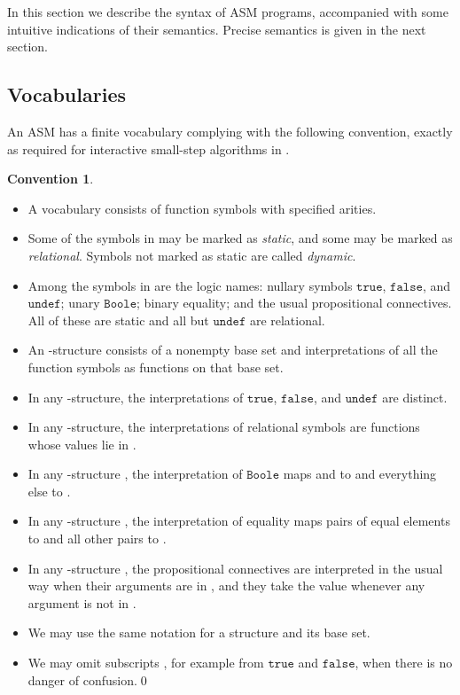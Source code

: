 \documentclass{LMCS}
\theoremstyle{definition}
\newtheorem{conn}[thm]{Convention}
\newenvironment{ls}{\begin{itemize}}{\end{itemize}}
\newcommand{\ttt}[1]{\ensuremath{\mathtt {#1}}}
\begin{document}
In this section we describe the syntax of ASM programs, accompanied
with some intuitive indications of their semantics.  Precise semantics
is given in the next section.

\subsection{Vocabularies}

An ASM has a finite vocabulary  complying with the following
convention, exactly as required for interactive small-step algorithms
in \cite{ga1}.

\begin{conn}   \label{vocab}
\mbox{}
  \begin{ls}
    \item A vocabulary  consists of function symbols with
    specified arities.
    \item Some of the symbols in  may be marked as
    \emph{static}, and some may be marked as \emph{relational}.
    Symbols not marked as static are called \emph{dynamic}.
    \item Among the symbols in  are the logic names: nullary
    symbols \ttt{true}, \ttt{false}, and \ttt{undef}; unary
    \ttt{Boole}; binary equality; and the usual propositional
    connectives.  All of these are static and all but \ttt{undef} are
    relational.
    \item An -structure consists of a nonempty base set and
      interpretations of all the function symbols as functions  on
      that base set.
    \item In any -structure, the interpretations of \ttt{true},
    \ttt{false}, and \ttt{undef} are distinct.
    \item In any -structure, the interpretations of relational
    symbols are functions whose values lie in
    .
  \item In any -structure , the interpretation of
    \ttt{Boole} maps  and  to
     and everything else to .
    \item In any -structure , the interpretation of
    equality maps pairs of equal elements to  and all
    other pairs to .
    \item In any -structure , the propositional connectives
    are interpreted in the usual way when their arguments are in
    , and they take the value
     whenever any argument is not in
    .
    \item We may use the same notation  for a structure and its
    base set.
\item We may omit subscripts , for example from \ttt{true} and
  \ttt{false}, when there is no danger of confusion.\qed
  \end{ls}
\end{conn}
\end{document}
